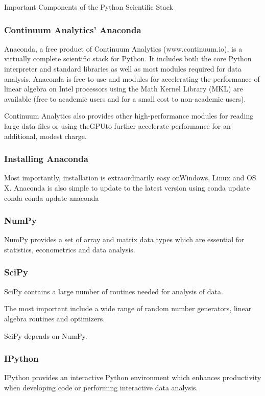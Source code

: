 \documentclass[MASTER.tex]{subfiles}
\begin{document}
 
\begin{frame}
Important Components of the Python Scientific Stack
\end{frame}
\begin{frame}
\frametitle{Continuum Analytics’ Anaconda}
Anaconda, a free product of Continuum Analytics (www.continuum.io), is a virtually complete scientific
stack for Python. It includes both the core Python interpreter and standard libraries as well as most
modules required for data analysis. Anaconda is free to use and modules for accelerating the performance
of linear algebra on Intel processors using the Math Kernel Library (MKL) are available (free to
academic users and for a small cost to non-academic users). 
\end{frame}
\begin{frame}
Continuum Analytics also provides other
high-performance modules for reading large data files or using theGPUto further accelerate performance
for an additional, modest charge. 
\end{frame}
\begin{frame}
\frametitle{Installing Anaconda}
Most importantly, installation is extraordinarily easy onWindows, Linux
and OS X. Anaconda is also simple to update to the latest version using
conda update conda
conda update anaconda
\end{frame}
\begin{frame}
\frametitle{NumPy}
NumPy provides a set of array and matrix data types which are essential for statistics, econometrics and
data analysis.
\end{frame}
\begin{frame}
\frametitle{SciPy}
SciPy contains a large number of routines needed for analysis of data. 

The most important include a wide
range of random number generators, linear algebra routines and optimizers. 

SciPy depends on NumPy.
\end{frame}
\begin{frame}
\frametitle{IPython}
IPython provides an interactive Python environment which enhances productivity when developing code
or performing interactive data analysis.
\end{frame}
\end{document}
